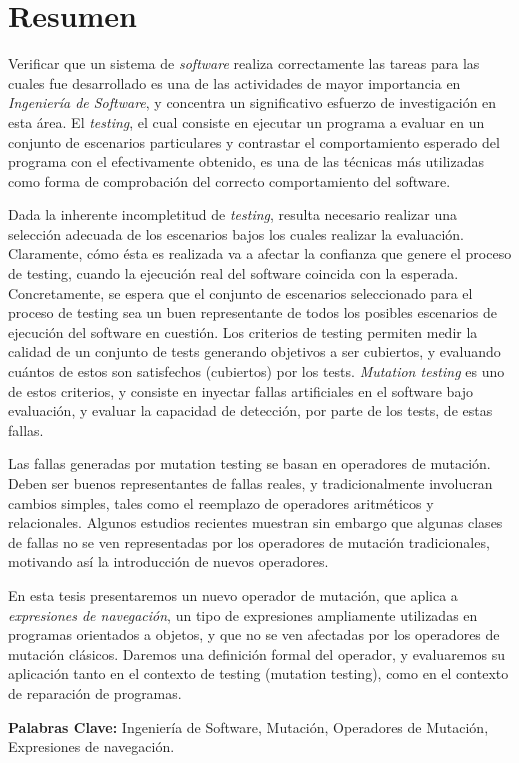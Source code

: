 \chapter*{Resumen}

Verificar que un sistema de \emph{software} realiza correctamente las tareas para las cuales fue desarrollado es una de las actividades de mayor importancia en \emph{Ingenier\'ia de Software}, y concentra un significativo esfuerzo de investigaci\'on en esta \'area. El \emph{testing}, el cual consiste en ejecutar un programa a evaluar en un conjunto de escenarios particulares y contrastar el comportamiento esperado del programa con el efectivamente obtenido, es una de las t\'ecnicas m\'as utilizadas como forma de comprobaci\'on del correcto comportamiento del software.

Dada la inherente incompletitud de \emph{testing}, resulta necesario realizar una selecci\'on adecuada de los escenarios bajos los cuales realizar la evaluaci\'on. Claramente, c\'omo \'esta es realizada va a afectar la confianza que genere el proceso de testing, cuando la ejecuci\'on real del software coincida con la esperada. Concretamente, se espera que el conjunto de escenarios seleccionado para el proceso de testing sea un buen representante de todos los posibles escenarios de ejecuci\'on del software en cuesti\'on. Los criterios de testing permiten medir la calidad de un conjunto de tests generando objetivos a ser cubiertos, y evaluando cu\'antos de estos son satisfechos (cubiertos) por los tests. \emph{Mutation testing} es uno de estos criterios, y consiste en inyectar fallas artificiales en el software bajo evaluaci\'on, y evaluar la capacidad de detecci\'on, por parte de los tests, de estas fallas.

Las fallas generadas por mutation testing se basan en operadores de mutaci\'on. Deben ser buenos representantes de fallas reales, y tradicionalmente involucran cambios simples, tales como el reemplazo de operadores aritm\'eticos y relacionales. Algunos estudios recientes muestran sin embargo que algunas clases de fallas no se ven representadas por los operadores de mutaci\'on tradicionales, motivando as\'i la introducci\'on de nuevos operadores. 

En esta tesis presentaremos un nuevo operador de mutaci\'on, que aplica a \emph{expresiones de navegaci\'on}, un tipo de expresiones ampliamente utilizadas en programas orientados a objetos, y que no se ven afectadas por los operadores de mutaci\'on cl\'asicos. Daremos una definici\'on formal del operador, y evaluaremos su aplicaci\'on tanto en el contexto de testing (mutation testing), como en el contexto de reparaci\'on de programas. 

\noindent
\textbf{Palabras Clave:} Ingenier\'ia de Software, Mutaci\'on, Operadores de Mutaci\'on, Expresiones de navegaci\'on.






